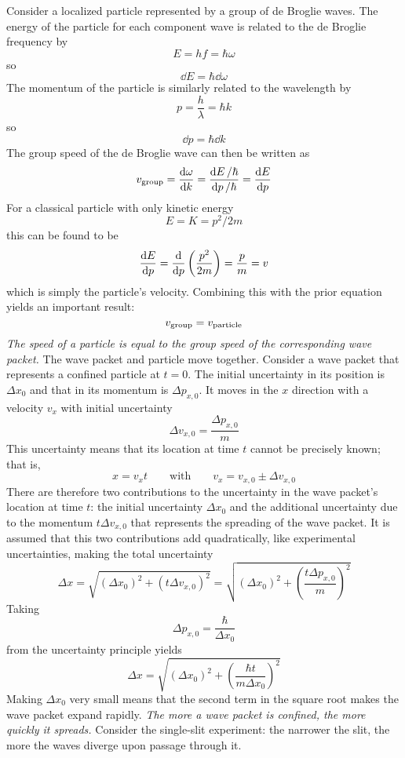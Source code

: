 \documentclass{subfiles}
\begin{document}
			Consider a localized particle represented by a group of de Broglie waves. The energy of the particle for each component wave is related to the de Broglie frequency by
				\[
					E = hf 
						= \hbar\omega
				\]
				so
				\[\dd{E} = \hbar\dd{\omega}\]
				The momentum of the particle is similarly related to the wavelength by
				\[
					p = \frac{h}{\lambda}
						= \hbar k
				\]
				so
				\[\dd{p} = \hbar\dd{k}\]
				The group speed of the de Broglie wave can then be written as
				\[
					v_{\text{group}} = \dv{\omega}{k}
						= \frac{\dd{E}/\hbar}{\dd{p}/\hbar}
						= \dv{E}{p}
				\]
				For a classical particle with only kinetic energy
				\[E = K = p^2/2m\]
				this can be found to be
				\[
					\dv{E}{p} = \dv{p}\left(\frac{p^2}{2m}\right)
						= \frac{p}{m}
						= v
				\]
				which is simply the particle's velocity. Combining this with the prior equation yields an important result:
				\[v_{\text{group}} = v_{\text{particle}}\]
				\textit{The speed of a particle is equal to the group speed of the corresponding wave packet.} The wave packet and particle move together.
			Consider a wave packet that represents a confined particle at \(t = 0\). The initial uncertainty in its position is \(\Delta x_0\) and that in its momentum is \(\Delta p_{x,0}\). It moves in the \(x\) direction with a velocity \(v_x\) with initial uncertainty
				\[\Delta v_{x, 0} = \frac{\Delta p_{x, 0}}{m}\]
				This uncertainty means that its location at time \(t\) cannot be precisely known; that is, 
				\[
					x = v_xt \qquad \text{with} \qquad
						v_x = v_{x, 0} \pm \Delta v_{x, 0}
				\]
				There are therefore two contributions to the uncertainty in the wave packet's location at time \(t\): the initial uncertainty \(\Delta x_0\) and the additional uncertainty due to the momentum \(t\Delta v_{x,0}\) that represents the spreading of the wave packet. It is assumed that this two contributions add quadratically, like experimental uncertainties, making the total uncertainty
				\[
					\Delta x = \sqrt{(\Delta x_0)^2 + (t\Delta v_{x, 0})^2}
						= \sqrt{(\Delta x_0)^2 + \left(\frac{t\Delta p_{x, 0}}{m}\right)^2}
				\]
				Taking
				\[\Delta p_{x, 0} = \frac{\hbar}{\Delta x_0}\]
				from the uncertainty principle yields
				\[\Delta x = \sqrt{(\Delta x_0)^2 + \left(\frac{\hbar t}{m\Delta x_0}\right)^2}\]
				Making \(\Delta x_0\) very small means that the second term in the square root makes the wave packet expand rapidly. \textit{The more a wave packet is confined, the more quickly it spreads.} Consider the single-slit experiment: the narrower the slit, the more the waves diverge upon passage through it.
\end{document}
